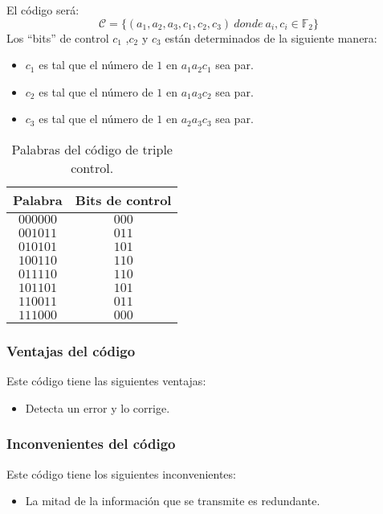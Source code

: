 El c\'odigo ser\'a:
\begin{displaymath}
\mathcal{C} = \{(a_1,a_2,a_3,c_1,c_2,c_3)\ donde\ a_i,c_i\in \mathbb{F}_2 \}
\end{displaymath}
Los ``bits'' de control $c_1$ ,$c_2$ y $c_3$ est\'an determinados de la
siguiente manera:
\begin{itemize}
\item $c_1$ es tal que el n\'umero de $1$ en $a_1a_2c_1$ sea par.
\item $c_2$ es tal que el n\'umero de $1$ en $a_1a_3c_2$ sea par.
\item $c_3$ es tal que el n\'umero de $1$ en $a_2a_3c_3$ sea par.
\end{itemize}
\begin{table}[!h]
\begin{center}
\begin{tabular}{|c|c|}
\hline
Palabra & Bits de control \\
\hline
$000000$ & $000$ \\
\hline
$001011$ & $011$ \\
\hline 
$010101$ & $101$ \\
\hline
$100110$ & $110$ \\
\hline
$011110$ & $110$ \\
\hline
$101101$ & $101$ \\
\hline
$110011$ & $011$ \\
\hline 
$111000$ & $000$ \\
\hline
\end{tabular}
\end{center}
\caption{Palabras del c\'odigo de triple control.}
\end{table}

\subsubsection{Ventajas del c\'odigo}

Este c\'odigo tiene las siguientes ventajas:
\begin{itemize}
\item Detecta un error y lo corrige.
\end{itemize}

\subsubsection{Inconvenientes del c\'odigo}

Este c\'odigo tiene los siguientes inconvenientes:
\begin{itemize}
\item La mitad de la informaci\'on que se transmite es redundante.
\end{itemize}

